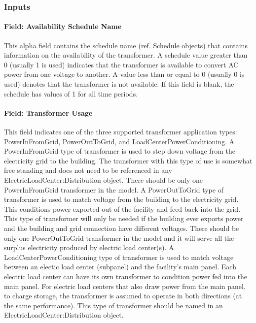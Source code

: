 \subsubsection{Inputs}\label{inputs-014}

\paragraph{Field: Availability Schedule Name}\label{field-availability-schedule-name-005}

This alpha field contains the schedule name (ref. Schedule objects) that contains information on the availability of the transformer. A schedule value greater than 0 (usually 1 is used) indicates that the transformer is available to convert AC power from one voltage to another. A value less than or equal to 0 (usually 0 is used) denotes that the transformer is not available. If this field is blank, the schedule has values of 1 for all time periods.

\paragraph{Field: Transformer Usage}\label{field-transformer-usage}

This field indicates one of the three supported transformer application types: PowerInFromGrid, PowerOutToGrid, and LoadCenterPowerConditioning. A PowerInFromGrid type of transformer is used to step down voltage from the electricity grid to the building. The transformer with this type of use is somewhat free standing and does not need to be referenced in any ElectricLoadCenter:Distribution object. There should be only one PowerInFromGrid transformer in the model. A PowerOutToGrid type of transformer is used to match voltage from the building to the electricity grid. This conditions power exported out of the facility and feed back into the grid. This type of transformer will only be needed if the building ever exports power and the building and grid connection have different voltages. There should be only one PowerOutToGrid transformer in the model and it will serve all the surplus electricity produced by electric load center(s). A LoadCenterPowerConditioning type of transformer is used to match voltage between an electic load center (subpanel) and the facility's main panel. Each electric load center can have its own transformer to condition power fed into the main panel. For electric load centers that also draw power from the main panel, to charge storage, the transformer is assumed to operate in both directions (at the same performance). This type of transformer should be named in an ElectricLoadCenter:Distribution object.

